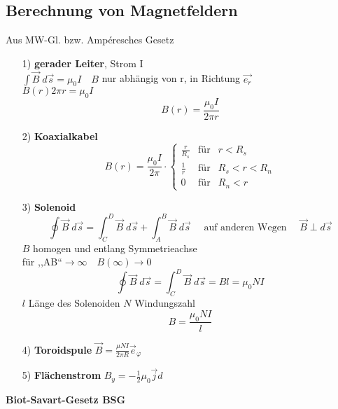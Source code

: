 \documentclass[titlepage,12pt,a4paper,ngerman]{report}
\newcommand{\tx}[1]{\textrm{#1}}
\begin{document}
\subsection{Berechnung von Magnetfeldern}
Aus MW-Gl. bzw. Ampéresches Gesetz
\begin{itemize}
	\item[1)] \textbf{gerader Leiter}, Strom I\\
	$ \int\vec{B} \; d \vec{s} = \mu _0 I \quad B $ nur abhängig von r, in Richtung $ \vec{e_r} $\\
	$ B(r) 2 \pi r = \mu_0 I $\\
	$$\boxed{B(r) = \frac{\mu_0 I}{2 \pi r}}$$
	\item[2)] \textbf{Koaxialkabel}
	$$B(r) = \frac{\mu_0 I}{2 \pi} \cdot
	\left\{ \begin{array}{ccc}
	\frac{r}{R_s} & \tx{für} & r < R_s\\
	\frac{1}{r} & \tx{für} & R_s < r < R_n\\
	0 & \tx{für} & R_n < r
	\end{array} \right.$$
	\item[3)] \textbf{Solenoid}
	$$\oint \vec{B} \; d \vec{s} = \int_{C}^{D} \vec{B} \; d \vec{s} + \int_{A}^{B} \vec{B} \; d \vec{s} \quad \tx{ auf anderen Wegen } \quad \vec{B} \perp d\vec{s}$$
	$B$ homogen und entlang Symmetrieachse \\
	für ,,AB``$ \rightarrow \infty  \quad B(\infty) \rightarrow 0$\\
	$$ \oint \vec{B} \; d\vec{s} = \int_{C}^{D} \vec{B}\; d \vec{s} = B l = \mu_0 N I$$
	$l$ Länge des Solenoiden $N$ Windungszahl
	$$\boxed{ B = \frac{\mu_0 N I }{l}}$$
	\item[4)] \textbf{Toroidspule}
	$ \vec{B} = \frac{\mu N I }{2 \pi R} \vec{e}_\varphi$
	\item[5)] \textbf{Flächenstrom} $B_y = -\frac{1}{2} \mu_0 \vec{j} d$
\end{itemize}\pagebreak
\textbf{Biot-Savart-Gesetz BSG}
\end{document}
